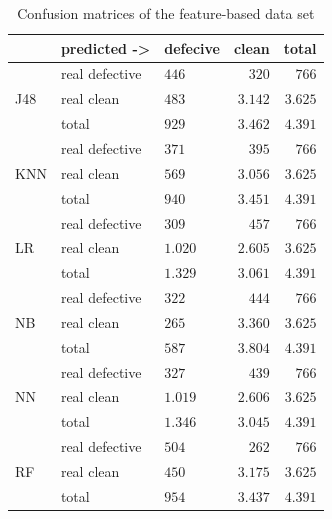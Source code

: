 \begin{table}[t]
\centering
\caption{Confusion matrices of the feature-based data set}
\label{tab:mat-feat}
\begin{tabular}{@{}lllrr@{}}
\toprule
\multicolumn{1}{c}{} & predicted -\textgreater{} & defecive & clean   & total   \\ \midrule
\multirow{3}{*}{J48} & real defective            & $446$    & $320$   & $766$   \\
                     & real clean                & $483$    & $3.142$ & $3.625$ \\
                     & total                     & $929$    & $3.462$ & $4.391$ \\ \midrule
\multirow{3}{*}{KNN} & real defective            & $371$    & $395$   & $766$   \\
                     & real clean                & $569$    & $3.056$ & $3.625$ \\
                     & total                     & $940$    & $3.451$ & $4.391$ \\ \midrule
\multirow{3}{*}{LR}  & real defective            & $309$    & $457$   & $766$   \\
                     & real clean                & $1.020$  & $2.605$ & $3.625$ \\
                     & total                     & $1.329$  & $3.061$ & $4.391$ \\ \midrule
\multirow{3}{*}{NB}  & real defective            & $322$    & $444$   & $766$   \\
                     & real clean                & $265$    & $3.360$ & $3.625$ \\
                     & total                     & $587$    & $3.804$ & $4.391$ \\ \midrule
\multirow{3}{*}{NN}  & real defective            & $327$    & $439$   & $766$   \\
                     & real clean                & $1.019$  & $2.60$6 & $3.625$ \\
                     & total                     & $1.346$  & $3.045$ & $4.391$ \\ \midrule
\multirow{3}{*}{RF}  & real defective            & $504$    & $262$   & $766$   \\
                     & real clean                & $450$    & $3.175$ & $3.625$ \\
                     & total                     & $954$    & $3.437$ & $4.391$ \\ \midrule

\end{tabular}
\end{table}

